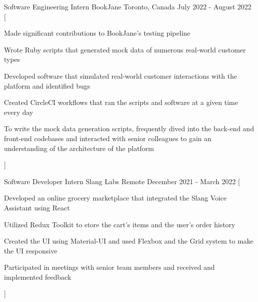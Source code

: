 

\begin{cventries}

  \cventry
    {Software Engineering Intern} %
    {BookJane} %
    {Toronto, Canada} %
    {July 2022 - August 2022} %
    [
      \begin{cvitems} %
        \item {Made significant contributions to BookJane's testing pipeline}
        \item {Wrote Ruby scripts that generated mock data of numerous real-world customer types}
        \item {Developed software that simulated real-world customer interactions with the platform and identified bugs}
        \item {Created CircleCI workflows that ran the scripts and software at a given time every day}
        \item {To write the mock data generation scripts, frequently dived into the back-end and front-end codebases and interacted with senior colleagues to gain an understanding of the architecture of the platform}
      \end{cvitems}
    ]

  \cventry
    {Software Developer Intern} %
    {Slang Labs} %
    {Remote} %
    {December 2021 - March 2022} %
    [
      \begin{cvitems} %
        \item {Developed an online grocery marketplace that integrated the Slang Voice Assistant using React}
        \item {Utilized Redux Toolkit to store the cart's items and the user's order history}
        \item {Created the UI using Material-UI and used Flexbox and the Grid system to make the UI responsive}
        \item {Participated in meetings with senior team members and received and implemented feedback}
      \end{cvitems}
    ]


\end{cventries}
